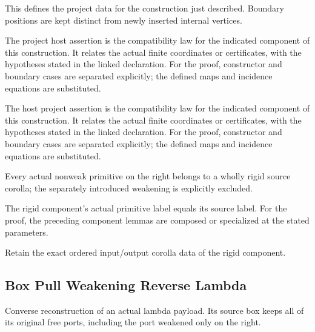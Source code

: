 This defines the project data for the construction just described. Boundary positions are kept distinct from newly inserted internal vertices.
\par{}

The project host assertion is the compatibility law for the indicated component of this construction. It relates the actual finite coordinates or certificates, with the hypotheses stated in the linked declaration.
For the proof, constructor and boundary cases are separated explicitly; the defined maps and incidence equations are substituted.
\par{}

The host project assertion is the compatibility law for the indicated component of this construction. It relates the actual finite coordinates or certificates, with the hypotheses stated in the linked declaration.
For the proof, constructor and boundary cases are separated explicitly; the defined maps and incidence equations are substituted.
\par{}

Every actual nonweak primitive on the right belongs to a wholly rigid source corolla; the separately introduced weakening is explicitly excluded.
\par{}

The rigid component's actual primitive label equals its source label.
For the proof, the preceding component lemmas are composed or specialized at the stated parameters.
\par{}

Retain the exact ordered input/output corolla data of the rigid component.
\par{}

\subsection{Box Pull Weakening Reverse Lambda}
Converse reconstruction of an actual lambda payload. Its source box keeps all of its original free ports, including the port weakened only on the right.


